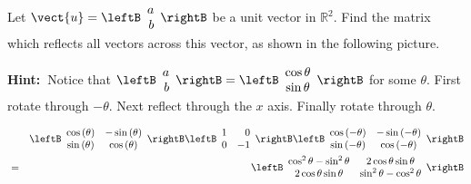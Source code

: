 \begin{enumialphparenastyle}
\begin{ex} Let $\vect{u}=\leftB 
\begin{array}{r}
a \\
b
\end{array}
\rightB $ be a unit vector in $\mathbb{R}^{2}.$ Find the matrix
 which reflects all vectors across
this vector, as shown in the following picture. 

\begin{center}
\end{center}


\textbf{Hint:\ }Notice that $\leftB 
\begin{array}{r}
a \\
b
\end{array}
\rightB =\leftB
\begin{array}{c}
\cos \theta  \\
\sin \theta 
\end{array}
\rightB $ for some $\theta .$ First rotate through $-\theta .$ Next reflect through the $x$ axis. Finally rotate
through $\theta $. 
\begin{sol}
\begin{eqnarray*}
&&\leftB
\begin{array}{cc}
\cos \left( \theta \right) & -\sin \left( \theta \right) \\
\sin \left( \theta \right) & \cos \left( \theta \right)
\end{array}
\rightB \leftB
\begin{array}{rr}
1 & 0 \\
0 & -1
\end{array}
\rightB \leftB
\begin{array}{cc}
\cos \left( -\theta \right) & -\sin \left( -\theta \right) \\
\sin \left( -\theta \right) & \cos \left( -\theta \right)
\end{array}
\rightB \\
&=& \leftB
\begin{array}{cc}
\cos ^{2}\theta -\sin ^{2}\theta & 2\cos \theta \sin \theta \\
2\cos \theta \sin \theta & \sin ^{2}\theta -\cos ^{2}\theta%
\end{array}
\rightB
\end{eqnarray*}

\end{sol}
\end{ex}
\end{enumialphparenastyle}
